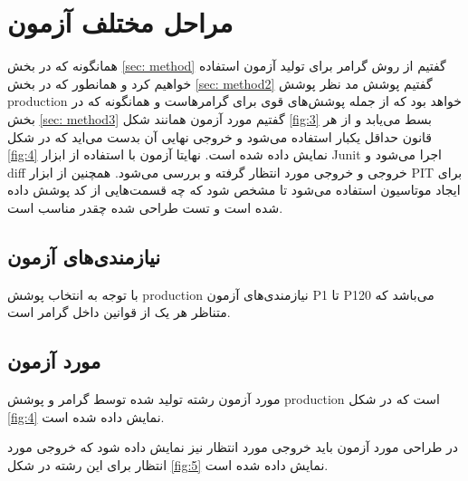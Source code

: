 \section{مراحل مختلف آزمون}
همانگونه که در بخش \ref{sec: method} گفتیم از روش گرامر برای تولید آزمون استفاده خواهیم کرد و همانطور که در بخش \ref{sec: method2} گفتیم پوشش مد نظر پوشش production خواهد بود که از جمله‌ پوشش‌های قوی‌ برای گرامر‌هاست و همانگونه که در بخش \ref{sec: method3} گفتیم مورد آزمون همانند شکل \ref{fig:3} بسط می‌یابد و از هر قانون حداقل یکبار استفاده می‌شود و خروجی نهایی آن بدست می‌اید که در شکل \ref{fig:4} نمایش داده شده است.  
نهایتا آزمون با استفاده از ابزار Junit اجرا می‌شود و diff خروجی و خروجی مورد انتظار گرفته و بررسی می‌شود. همچنین از ابزار PIT برای ایجاد موتاسیون استفاده می‌شود تا مشخص شود که چه قسمت‌هایی از کد پوشش داده شده است و تست طراحی شده چقدر مناسب است.

\subsection{نیازمندی‌های آزمون}
با توجه به انتخاب پوشش production نیازمندی‌های آزمون P1 تا P120 می‌باشد که متناظر هر یک از قوانین داخل گرامر است.

\subsection{مورد آزمون}
مورد آزمون رشته تولید شده توسط گرامر و پوشش production است که در شکل \ref{fig:4} نمایش داده شده است.

در طراحی مورد آزمون باید خروجی مورد انتظار نیز نمایش داده شود که خروجی مورد انتظار برای این رشته در شکل \ref{fig:5} نمایش داده شده است.

